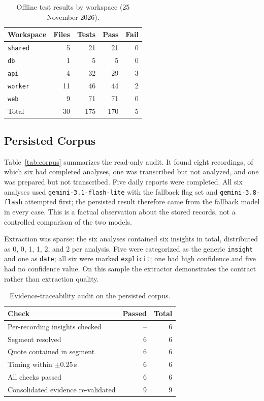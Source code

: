 \documentclass[conference,a4paper]{IEEEtran}
\newcommand{\code}[1]{\texttt{#1}}
\begin{document}
\begin{table}[t]
\centering
\caption{Offline test results by workspace (25 November 2026).}
\label{tab:tests}
\small
\renewcommand{\arraystretch}{1.1}
\begin{tabular}{@{}lrrrr@{}}
\toprule
Workspace & Files & Tests & Pass & Fail \\
\midrule
\code{shared} & 5 & 21 & 21 & 0 \\
\code{db} & 1 & 5 & 5 & 0 \\
\code{api} & 4 & 32 & 29 & 3 \\
\code{worker} & 11 & 46 & 44 & 2 \\
\code{web} & 9 & 71 & 71 & 0 \\
\midrule
Total & 30 & 175 & 170 & 5 \\
\bottomrule
\end{tabular}
\end{table}

\subsection{Persisted Corpus}

Table~\ref{tab:corpus} summarizes the read-only audit. It found eight recordings, of which
six had completed analyses, one was transcribed but not analyzed, and one was prepared but
not transcribed. Five daily reports were completed. All six analyses used
\code{gemini-3.1-flash-lite} with the fallback flag set and \code{gemini-3.8-flash}
attempted first; the persisted result therefore came from the fallback model in every
case. This is a factual observation about the stored records, not a controlled comparison
of the two models.

Extraction was sparse: the six analyses contained six insights in total, distributed as
0, 0, 1, 1, 2, and 2 per analysis. Five were categorized as the generic \code{insight} and
one as \code{date}; all six were marked \code{explicit}; one had high confidence and five
had no confidence value. On this sample the extractor demonstrates the contract rather than
extraction quality.

\begin{table}[t]
\centering
\caption{Evidence-traceability audit on the persisted corpus.}
\label{tab:evidence}
\small
\renewcommand{\arraystretch}{1.1}
\begin{tabular}{@{}lrr@{}}
\toprule
Check & Passed & Total \\
\midrule
Per-recording insights checked & -- & 6 \\
Segment resolved & 6 & 6 \\
Quote contained in segment & 6 & 6 \\
Timing within $\pm0.25$\,s & 6 & 6 \\
All checks passed & 6 & 6 \\
\midrule
Consolidated evidence re-validated & 9 & 9 \\
\bottomrule
\end{tabular}
\end{table}
\end{document}
